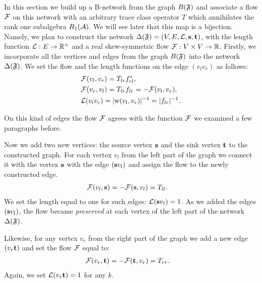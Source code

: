 \documentclass[12pt,oneside,a4paper]{amsart}
\begin{document}
      In this section we build up a B-network from the graph $B(\fsys)$ and associate a flow $\flow$ on this network with 
        an arbitrary trace class operator $T$ which annihilates the rank one subalgebra $R_1(\cal{A})$.
      We will see later that this map is a bijection.
      Namely, we plan to construct the network $\net(\fsys) = (V, E, \len, \source, \sink)$,
        with the length function $\len: E \to \mathbb{R}^{+}$ and a real skew-symmetric flow $\flow: V \times V \to \mathbb{R}$.
      Firstly, we incorporate all the vertices and edges from the graph $B(\fsys)$ into the network $\net(\fsys)$.
      We set the flow and the length functions on the edge $(v_l v_r)$ as follows:
      \begin{align*}
        &\flow(v_l, v_r) = T_{lr} f^*_{rl},\\
        &\flow(v_r, v_l) = T_{lr} f_{lr} = -\flow(v_l, v_r),\\
        &\len(v_l v_r) = \lvert \wt(v_l, v_r) \rvert^{-1} =  \lvert f_{lr}\rvert^{-1}.
      \end{align*}
      \begin{remark}
        On this kind of edges the flow $\flow$ agrees with the function $\flowsgn$
          we examined a few paragraphs before.
      \end{remark}

      Now we add two new vertices: the source vertex $\source$ and the sink vertex $\sink$ to the constructed graph.
      For each vertex $v_l$ from the left part of the graph we connect it with the vertex $\source$ with the edge $(\source v_l)$
        and assign the flow to the newly constructed edge.
      \begin{align*}
        &\flow(v_l, \source) = -\flow(\source, v_l) = T_{ll}.
      \end{align*}
      We set the length equal to one for such edges: $\len(\source v_l) = 1$.
      As we added the edges $(\source v_l)$, the flow became \emph{preserved} at each vertex of the left part of the network $\net(\fsys)$.

      Likewise, for any vertex $v_r$ from the right part of the graph we add a new edge $(v_r \sink)$
        and set the flow $\flow$ equal to:
      \begin{align*}
        &\flow(v_r, \sink) = -\flow(\sink, v_r) =  T_{rr}.
      \end{align*}
      Again, we set $\len(v_r \sink) = 1$ for any $k$.
\end{document}
